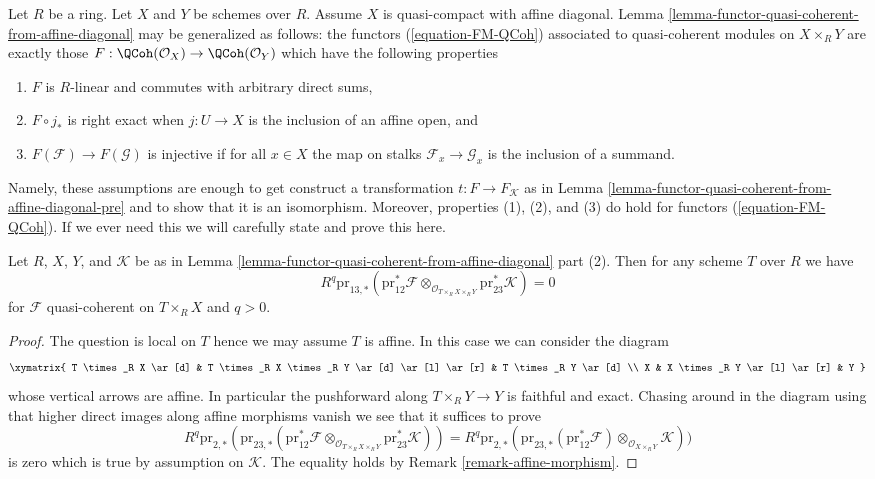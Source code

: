 \begin{remark}
\label{remark-characterize-FM-QCoh}
Let $R$ be a ring. Let $X$ and $Y$ be schemes over $R$. Assume $X$
is quasi-compact with affine diagonal.
Lemma \ref{lemma-functor-quasi-coherent-from-affine-diagonal} may
be generalized as follows: the functors
(\ref{equation-FM-QCoh}) associated to quasi-coherent modules on
$X \times_R Y$ are exactly those
$F : \QCoh(\mathcal{O}_X) \to \QCoh(\mathcal{O}_Y)$
which have the following properties
\begin{enumerate}
\item $F$ is $R$-linear and commutes with arbitrary direct sums,
\item $F \circ j_*$ is right exact when $j : U \to X$ is the
inclusion of an affine open, and
\item $F(\mathcal{F}) \to F(\mathcal{G})$ is injective
if for all $x \in X$ the map on stalks $\mathcal{F}_x \to \mathcal{G}_x$
is the inclusion of a summand.
\end{enumerate}
Namely, these assumptions are enough to get construct a transformation
$t : F \to F_\mathcal{K}$ as in
Lemma \ref{lemma-functor-quasi-coherent-from-affine-diagonal-pre}
and to show that it is an isomorphism. Moreover, properties (1), (2), and (3)
do hold for functors (\ref{equation-FM-QCoh}).
If we ever need this we will carefully state and prove this here.
\end{remark}

\begin{lemma}
\label{lemma-persistence-exactness}
Let $R$, $X$, $Y$, and $\mathcal{K}$ be as in
Lemma \ref{lemma-functor-quasi-coherent-from-affine-diagonal} part (2).
Then for any scheme $T$ over $R$ we have
$$
R^q\text{pr}_{13, *}(\text{pr}_{12}^*\mathcal{F}
\otimes_{\mathcal{O}_{T \times_R X \times_R Y}}
\text{pr}_{23}^*\mathcal{K}) = 0
$$
for $\mathcal{F}$ quasi-coherent on $T \times_R X$ and $q > 0$.
\end{lemma}

\begin{proof}
The question is local on $T$ hence we may assume $T$ is affine.
In this case we can consider the diagram
$$
\xymatrix{
T \times_R X \ar[d] &
T \times_R X \times_R Y \ar[d] \ar[l] \ar[r] &
T \times_R Y \ar[d] \\
X &
X \times_R Y \ar[l] \ar[r] &
Y
}
$$
whose vertical arrows are affine. In particular the pushforward along
$T \times_R Y \to Y$ is faithful and exact. Chasing around in the diagram
using that higher direct images along affine morphisms vanish we see that
it suffices to prove
$$
R^q\text{pr}_{2, *}(
\text{pr}_{23, *}(\text{pr}_{12}^*\mathcal{F}
\otimes_{\mathcal{O}_{T \times_R X \times_R Y}}
\text{pr}_{23}^*\mathcal{K})) =
R^q\text{pr}_{2, *}(
\text{pr}_{23, *}(\text{pr}_{12}^*\mathcal{F})
\otimes_{\mathcal{O}_{X \times_R Y}}
\mathcal{K}))
$$
is zero which is true by assumption on $\mathcal{K}$.
The equality holds by Remark \ref{remark-affine-morphism}.
\end{proof}

